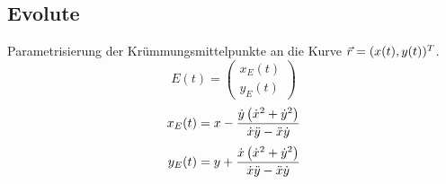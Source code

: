 \subsection{Evolute}
    Parametrisierung der Krümmungsmittelpunkte an die Kurve $\vec{r} = (x(t), y(t))^T$.
    $$
        E(t) = 
        \begin{pmatrix}
            x_E(t)\\y_E(t)
        \end{pmatrix}
    $$
    \begin{align*}
        x_E(t) &= x - \frac{\dot{y} \left( \dot{x}^2 + \dot{y}^2 \right)}{\dot{x} \ddot{y} - \ddot{x} \dot{y}}\\[0.25em]
        y_E(t) &= y + \frac{\dot{x} \left( \dot{x}^2 + \dot{y}^2 \right)}{\dot{x} \ddot{y} - \ddot{x} \dot{y}}
    \end{align*}